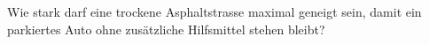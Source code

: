 Wie stark darf eine trockene Asphaltstrasse maximal geneigt sein, damit ein parkiertes Auto ohne zusätzliche Hilfsmittel stehen bleibt?
